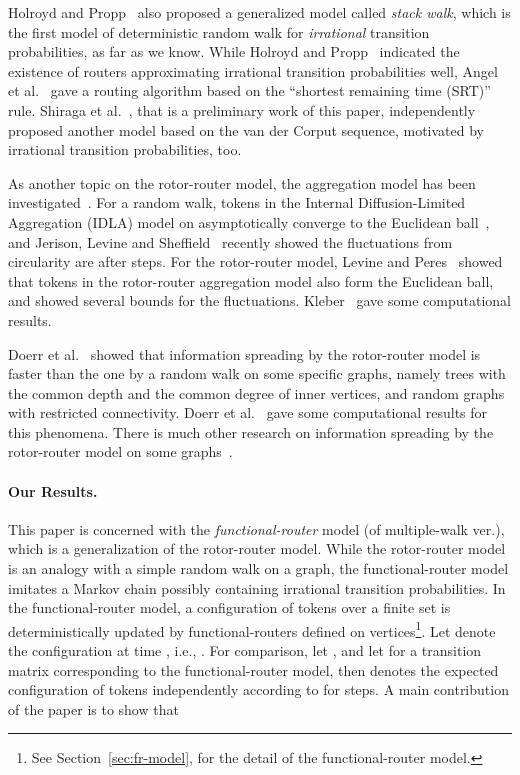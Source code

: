 \documentclass[letter, 11pt]{article}
\newcommand{\1}{\mbox{1}\hspace{-0.25em}\mbox{l}}
\begin{document}
Holroyd and Propp~\cite{HP10} also proposed a generalized model called {\em stack walk}, 
   which is the first model of deterministic random walk for {\em irrational} transition probabilities, as far as we know. 
While Holroyd and Propp~\cite{HP10} indicated the existence of routers 
   approximating irrational transition probabilities well, 
 Angel et al.~\cite{AJJ10} gave a routing algorithm based on the ``shortest remaining time (SRT)'' rule. 
Shiraga et al.~\cite{shiraga}, that is a preliminary work of this paper, 
  independently proposed another model based on the van der Corput sequence, 
  motivated by irrational transition probabilities, too. 

As another topic on the rotor-router model, 
  the aggregation model has been investigated~\cite{LP05, Kleber05, LP08, LP09}. 
 For a random walk, 
  tokens in the Internal Diffusion-Limited Aggregation (IDLA) model on  
   asymptotically converge to the Euclidean ball~\cite{LBG92}, and  
 Jerison, Levine and Sheffield~\cite{JLS12} recently showed  
  the fluctuations from circularity are  after  steps.
 For the rotor-router model, 
  Levine and Peres~\cite{LP05, LP08, LP09} showed that 
  tokens in the rotor-router aggregation model also form the Euclidean ball, and  
  showed several bounds for the fluctuations. 
Kleber~\cite{Kleber05} gave some computational results. 

Doerr et al.~\cite{DFS08} showed that 
  information spreading by the rotor-router model is faster than the one by a random walk 
 on some specific graphs, 
  namely trees with the common depth and the common degree of inner vertices, and 
  random graphs with restricted connectivity.  
 Doerr et al.~\cite{DFKS09} 
   gave some computational results for this phenomena. 
 There is much other research on information spreading 
  by the rotor-router model on some graphs~\cite{ADHP09, Doerr09, DFS09a, DFS09b, DHL09, HF09}.

\paragraph{Our Results.}This paper is concerned with the {\em functional-router} model (of multiple-walk ver.), 
   which is a generalization of the rotor-router model. 
 While the rotor-router model is an analogy with a simple random walk on a graph, 
  the functional-router model imitates a Markov chain 
  possibly containing irrational transition probabilities. 
 In the functional-router model, 
  a configuration of  tokens over a finite set  
  is deterministically updated by functional-routers defined on vertices\footnote{
    See Section~\ref{sec:fr-model}, for the detail of the functional-router model.}. 
 Let  denote 
   the configuration at time , 
   i.e., . 
 For comparison, 
  let , and 
  let  for a transition matrix  corresponding to the functional-router model, 
 then 
   denotes the expected configuration of  tokens 
  independently according to  for  steps. 
 A main contribution of the paper is to show that  
    
\end{document}
